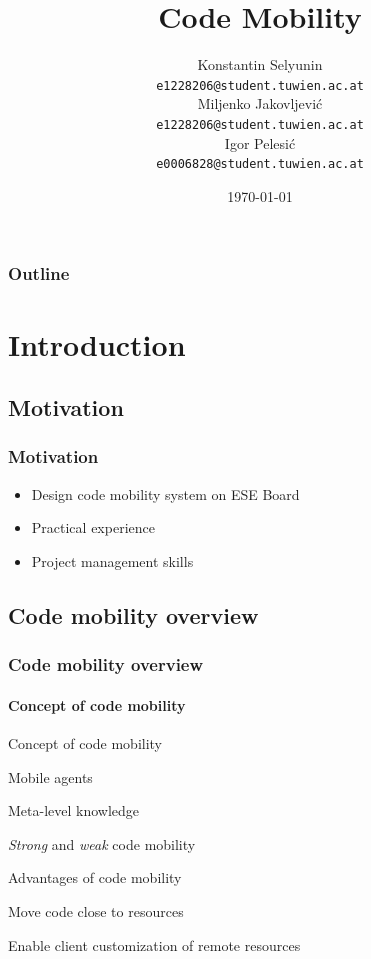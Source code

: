 \documentclass{beamer}
\title[Code Mobility]{Code Mobility}
\date{\today}
\author[Jakovljevi\'c,Selyunin,Pelesi\'c]{
 \Large{Konstantin Selyunin}\\
  \small{\texttt{e1228206@student.tuwien.ac.at}}\\
 \Large{Miljenko Jakovljevi\'c}\\
  \small{\texttt{e1228206@student.tuwien.ac.at}}\\
  \Large{Igor Pelesi\'c}\\
  \small{\texttt{e0006828@student.tuwien.ac.at}}\\
}
\theoremstyle{definition} \newtheorem{mdefinition}{Definition}
\theoremstyle{plain} \newtheorem{mtheorem}{Theorem}
\theoremstyle{plain} \newtheorem{mcorollary}{Corollary}
\theoremstyle{plain} \newtheorem{mfact}{Fact}
\begin{document}
\begin{frame}
	\titlepage
\end{frame}

\begin{frame}
	\frametitle{Outline}
	\tableofcontents
\end{frame}

\section{Introduction}
\subsection{Motivation}
\begin{frame}[fragile]
	\frametitle{Motivation}
	\begin{itemize}
		\item Design code mobility system on ESE Board
		\item Practical experience
		\item Project management skills
	\end{itemize}
\end{frame}

\subsection{Code mobility overview}
\begin{frame}
	\frametitle{Code mobility overview}
 		\framesubtitle{Concept of code mobility}
	\begin{block}{Concept of code mobility}
		\begin{description}
			\item	Mobile agents
			\item	Meta-level knowledge
			\item	{\it Strong} and {\it weak} code mobility
		\end{description}
	\end{block}

	\begin{block}{Advantages of code mobility}
		\begin{description}
			\item	Move code close to resources 
			\item	Enable client customization of remote resources
			\item	
		\end{description}
	\end{block}	

\end{frame}
\end{document}
